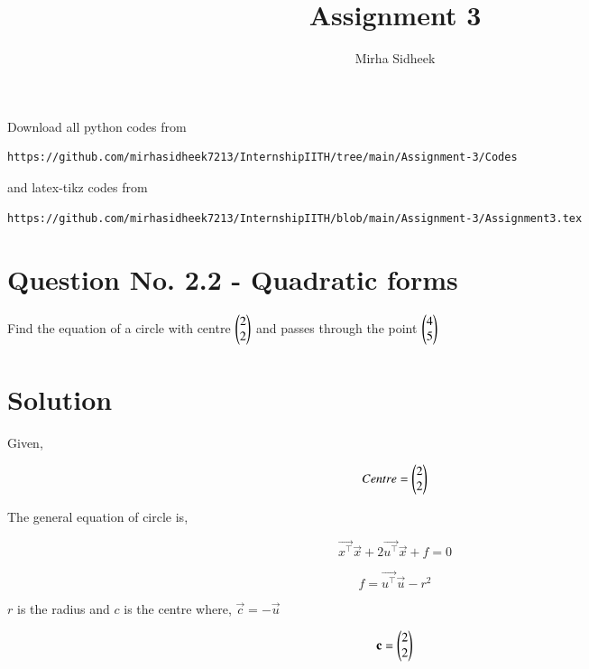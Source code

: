 \documentclass[journal,12pt,twocolumn]{IEEEtran}
\begin{document}
     \def\centbox#1{\makebox[0in]{#1}}
     \def\topbox#1{\raisebox{-\baselineskip}[0in][0in]{#1}}
     \def\midbox#1{\raisebox{-0.5\baselineskip}[0in][0in]{#1}}
\vspace{3cm}
\title{Assignment 3}
\author{Mirha Sidheek}
\maketitle
\newpage
\bigskip
\renewcommand{\thefigure}{\theenumi}
\renewcommand{\thetable}{\theenumi}
Download all python codes from 
\begin{lstlisting}
https://github.com/mirhasidheek7213/InternshipIITH/tree/main/Assignment-3/Codes
\end{lstlisting}

%
and latex-tikz codes from 
%
\begin{lstlisting}
https://github.com/mirhasidheek7213/InternshipIITH/blob/main/Assignment-3/Assignment3.tex
\end{lstlisting}

\section{\textbf{Question No. 2.2 - Quadratic forms}}

 Find the equation of a circle with centre $\begin{pmatrix}2\\2\end{pmatrix}$ and passes through the point $\begin{pmatrix}4\\5\end{pmatrix}$
%

\section{\textbf {Solution}}
Given, 

\begin{equation}
    Centre = \begin{pmatrix}2\\2\end{pmatrix} 
\end{equation}

The general equation of circle is,

\begin{equation}
\vec{x^\top}\vec{x}+2\vec{u^\top}\vec{x}+f=0 \label{eq:1}
\end{equation}

\begin{equation}
    f=\vec{u^\top}\vec{u}-r^2
\end{equation}

$r$ is the radius and $c$ is the centre where, $\vec{c}=-\vec{u}$

\begin{equation}
    \mathbf c=\begin{pmatrix}2\\2\end{pmatrix}
\end{equation}
\end{document}
